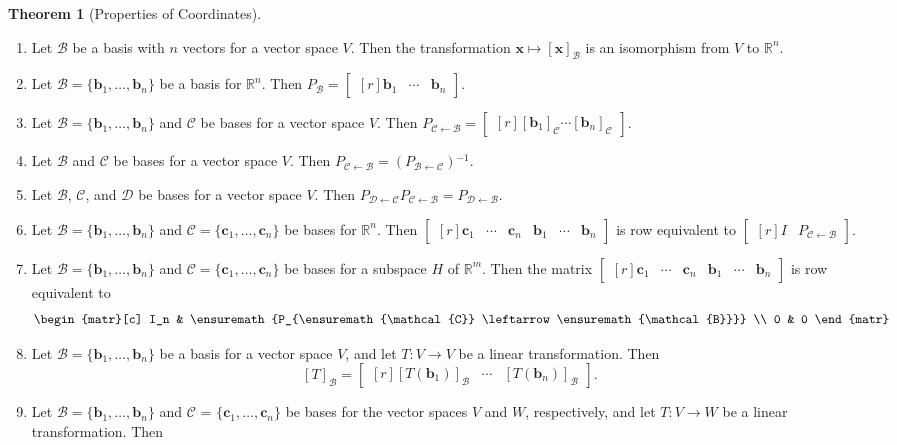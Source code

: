 \documentclass{myart}
\renewcommand{\vec}[1]{\ensuremath{\mathbf{#1}}} %
\newcommand{\mat}[1]{\ensuremath{#1}} %
\newcommand{\R}[1][]{\ensuremath{\mathbb{R}^{#1}}} %
\newcommand{\MAT}[2][r]{\ensuremath{\begin{bmatrix*}[#1]#2\end{bmatrix*}}} %
\newcommand{\set}[1]{\ensuremath{\{#1\}}} %
\newcommand{\inv}{\ensuremath{^{-1}}} %
\newcommand{\basis}[1]{\ensuremath{\mathcal{#1}}} %
\newcommand{\from}{\leftarrow} %
\newcommand{\coord}[2]{\ensuremath{\left[#1\right]_{#2}}} %
\newcommand{\chcoordr}[1]{\ensuremath{P_{#1}}} %
\newcommand{\chcoord}[2]{\ensuremath{P_{#1 \from #2}}} %
\newcommand{\transmat}[2]{\coord{#1}{#2}} %
\newcommand{\many}[2][n]{\ensuremath{{#2}_1, \ldots, {#2}_{#1}}} %
\theoremstyle{definition}
\newtheorem{thm}{Theorem}
\begin{document}
\begin{thm}[Properties of Coordinates] \hfill
\begin{enumerate}
\item Let \basis B be a basis with $n$ vectors for a vector space $V$. Then the transformation $\vec x \mapsto \coord{\vec x}{\basis B}$ is an isomorphism from $V$ to \R[n].
\item Let $\basis B = \set{\many{\vec b}}$ be a basis for \R[n]. Then $\chcoordr{\basis B} = \MAT{\vec b_1 & \cdots & \vec b_n}$.
\item Let $\basis B = \set{\many{\vec b}}$ and \basis C be bases for a vector space $V$. Then $\chcoord{\basis C}{\basis B} = \MAT{\coord{\vec b_1}{\basis C} \cdots \coord{\vec b_n}{\basis C}}$.
\item Let \basis B and \basis C be bases for a vector space $V$. Then $\chcoord{\basis C}{\basis B} = \left(\chcoord{\basis B}{\basis C}\right)\inv$.
\item Let \basis B, \basis C, and \basis D be bases for a vector space $V$. Then $\chcoord{\basis D}{\basis C} \chcoord{\basis C}{\basis B} = \chcoord{\basis D}{\basis B}$.
\item Let $\basis B = \set{\many{\vec b}}$ and $\basis C = \set{\many{\vec c}}$ be bases for \R[n]. Then \MAT{\vec c_1 & \cdots & \vec c_n & \vec b_1 & \cdots & \vec b_n} is row equivalent  to \MAT{\mat I & \chcoord{\basis C}{\basis B}}.
\item Let $\basis B = \set{\many{\vec b}}$ and $\basis C = \set{\many{\vec c}}$ be bases for a subspace $H$ of \R[m]. Then the matrix \MAT{\vec c_1 & \cdots & \vec c_n & \vec b_1 & \cdots & \vec b_n} is row equivalent to
\begin{equation*}
\begin{matr}[c]
I_n & \chcoord{\basis C}{\basis B} \\
0 & 0
\end{matr}
\end{equation*}
\item Let $\basis B = \set{\many{\vec b}}$ be a basis for a vector space $V$, and let $T: V \to V$ be a linear transformation. Then
\begin{equation*}
\transmat{T}{\basis B} = \MAT{\coord{T(\vec b_1)}{\basis B} & \cdots & \coord{T(\vec b_n)}{\basis B}}.
\end{equation*}
\item Let $\basis B = \set{\many{\vec b}}$ and \basis C = \set{\many{\vec c}} be bases for the vector spaces $V$ and $W$, respectively, and let $T: V \to W$ be a linear transformation. Then

\end{enumerate}
\end{thm}
\end{document}
